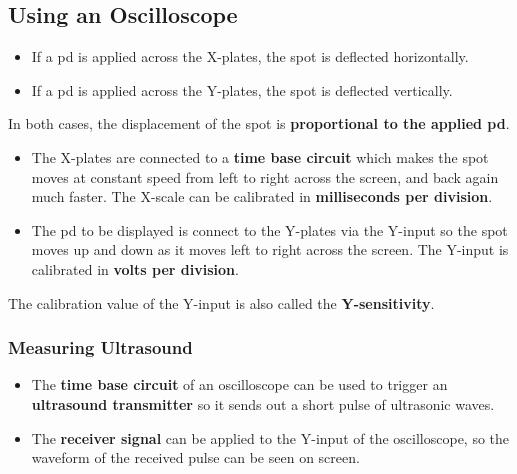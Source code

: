 \subsection{Using an Oscilloscope}

\begin{itemize}
    \item If a pd is applied across the X-plates, the spot is deflected horizontally.
    \item If a pd is applied across the Y-plates, the spot is deflected vertically.
\end{itemize}
In both cases, the displacement of the spot is \textbf{proportional to the applied pd}.

\begin{itemize}
    \item The X-plates are connected to a \textbf{time base circuit} which makes the spot moves at constant speed from left to right across the screen, and back again much faster. The X-scale can be calibrated in \textbf{milliseconds per division}.
    \item The pd to be displayed is connect to the Y-plates via the Y-input so the spot moves up and down as it moves left to right across the screen. The Y-input is calibrated in \textbf{volts per division}.
\end{itemize}
The calibration value of the Y-input is also called the \textbf{Y-sensitivity}.

\subsubsection*{Measuring Ultrasound}

\begin{itemize}
    \item The \textbf{time base circuit} of an oscilloscope can be used to trigger an \textbf{ultrasound transmitter} so it sends out a short pulse of ultrasonic waves.
    \item The \textbf{receiver signal} can be applied to the Y-input of the oscilloscope, so the waveform of the received pulse can be seen on screen.
\end{itemize}
